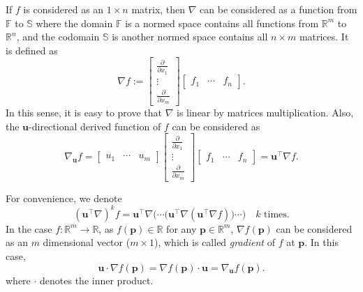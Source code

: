 \begin{note}
	If $f$ is considered as an $1 \times n$ matrix, then $\nabla$ can be considered as a function from $\mathbb F$ to $\mathbb S$ where the domain $\mathbb F$ is a normed space contains all functions from $\mathbb R^m$ to $\mathbb R^n$, and the codomain $\mathbb S$ is another normed space contains all $n \times m$ matrices. It is defined as
	$$
	\nabla f :=
	\left[
	\begin{matrix}
	\displaystyle \frac{\partial}{\partial x_1} \\
	\vdots \\
	\displaystyle \frac{\partial}{\partial x_m}
	\end{matrix}
	\right]
	\left[
	\begin{matrix}
	f_1 & \cdots & f_n
	\end{matrix}
	\right].
	$$
	In this sense, it is easy to prove that $\nabla$ is linear by matrices multiplication. Also, the $\mathbf u$-directional derived function of $f$ can be considered as
	$$
	\nabla_\mathbf u f =
	\left[
	\begin{matrix}
	u_1 & \cdots & u_m
	\end{matrix}
	\right]
	\left[
	\begin{matrix}
	\displaystyle \frac{\partial}{\partial x_1} \\
	\vdots \\
	\displaystyle \frac{\partial}{\partial x_m}
	\end{matrix}
	\right]
	\left[
	\begin{matrix}
	f_1 & \cdots & f_n
	\end{matrix}
	\right]
	= \mathbf u^\top\nabla f.
	$$
	
	For convenience, we denote
	$$
	(\mathbf u^\top \nabla)^k f = \mathbf u^\top \nabla\Big( \cdots \big(\mathbf u^\top \nabla(\mathbf u^\top \nabla f) \big) \cdots \Big) \quad \text{$k$ times}.
	$$
	In the case $f: \mathbb R^m \to \mathbb R$, as $f (\mathbf p) \in \mathbb R$ for any $\mathbf p \in \mathbb R^m$, $\nabla f(\mathbf p)$ can be considered as an $m$ dimensional vector ($m \times 1$), which is called \textit{gradient} of $f$ at $\mathbf p$. In this case,
	$$
	\mathbf u \cdot \nabla f(\mathbf p) = \nabla f(\mathbf p) \cdot \mathbf u = \nabla_{\mathbf u}f(\mathbf p).
	$$
	where $\cdot$ denotes the inner product.
\end{note}



